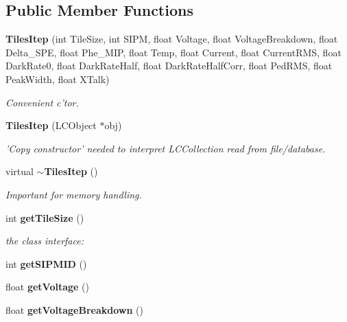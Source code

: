 \subsection*{Public Member Functions}
\begin{DoxyCompactItemize}
\item 
{\bf Tiles\-Itep} (int Tile\-Size, int S\-I\-P\-M, float Voltage, float Voltage\-Breakdown, float Delta\-\_\-\-S\-P\-E, float Phe\-\_\-\-M\-I\-P, float Temp, float Current, float Current\-R\-M\-S, float Dark\-Rate0, float Dark\-Rate\-Half, float Dark\-Rate\-Half\-Corr, float Ped\-R\-M\-S, float Peak\-Width, float X\-Talk)\label{classCALICE_1_1TilesItep_ab520e15a1890c3b126d618ae50203149}

\begin{DoxyCompactList}\small\item\em Convenient c'tor. \end{DoxyCompactList}\item 
{\bf Tiles\-Itep} (L\-C\-Object $\ast$obj)\label{classCALICE_1_1TilesItep_a252385be65292a3685b811971c77936e}

\begin{DoxyCompactList}\small\item\em 'Copy constructor' needed to interpret L\-C\-Collection read from file/database. \end{DoxyCompactList}\item 
virtual {\bf $\sim$\-Tiles\-Itep} ()\label{classCALICE_1_1TilesItep_a4e78e1645521257e9f203f41b05dd11d}

\begin{DoxyCompactList}\small\item\em Important for memory handling. \end{DoxyCompactList}\item 
int {\bf get\-Tile\-Size} ()\label{classCALICE_1_1TilesItep_a8c37e7a95a4c75865367802e07bf4d9e}

\begin{DoxyCompactList}\small\item\em the class interface\-: \end{DoxyCompactList}\item 
int {\bfseries get\-S\-I\-P\-M\-I\-D} ()\label{classCALICE_1_1TilesItep_ac8ee2c984e4ebbbd46f9302ff15d0aa4}

\item 
float {\bfseries get\-Voltage} ()\label{classCALICE_1_1TilesItep_aafa1a1d65569c178442f2820be77b289}

\item 
float {\bfseries get\-Voltage\-Breakdown} ()\label{classCALICE_1_1TilesItep_a2010bc99a78518b307feee4257fd99d6}


\end{DoxyCompactItemize}
